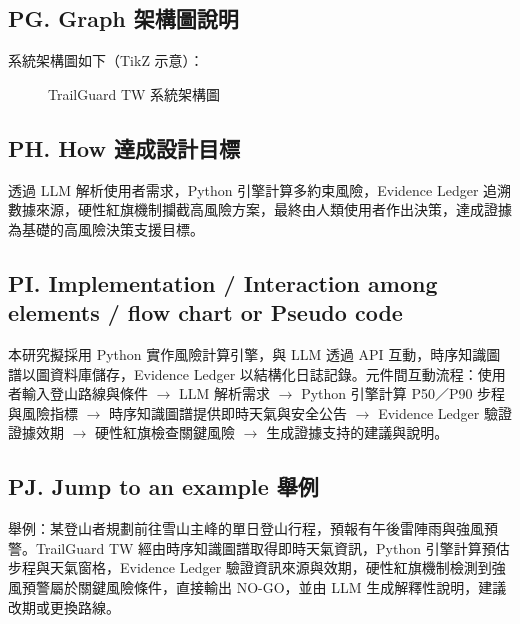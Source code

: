 \documentclass[12pt,a4paper]{article}
\begin{document}
\subsection*{PG. Graph 架構圖說明}
系統架構圖如下（TikZ 示意）：

\begin{figure}[htbp]
\centering
{}
\caption{TrailGuard TW 系統架構圖}
\label{fig:architecture}
\end{figure}

\subsection*{PH. How 達成設計目標}
透過 LLM 解析使用者需求，Python 引擎計算多約束風險，Evidence Ledger 追溯數據來源，硬性紅旗機制攔截高風險方案，最終由人類使用者作出決策，達成證據為基礎的高風險決策支援目標。

\subsection*{PI. Implementation / Interaction among elements / flow chart or Pseudo code}
本研究擬採用 Python 實作風險計算引擎，與 LLM 透過 API 互動，時序知識圖譜以圖資料庫儲存，Evidence Ledger 以結構化日誌記錄。元件間互動流程：使用者輸入登山路線與條件 $\rightarrow$ LLM 解析需求 $\rightarrow$ Python 引擎計算 P50／P90 步程與風險指標 $\rightarrow$ 時序知識圖譜提供即時天氣與安全公告 $\rightarrow$ Evidence Ledger 驗證證據效期 $\rightarrow$ 硬性紅旗檢查關鍵風險 $\rightarrow$ 生成證據支持的建議與說明。

\subsection*{PJ. Jump to an example 舉例}
舉例：某登山者規劃前往雪山主峰的單日登山行程，預報有午後雷陣雨與強風預警。TrailGuard TW 經由時序知識圖譜取得即時天氣資訊，Python 引擎計算預估步程與天氣窗格，Evidence Ledger 驗證資訊來源與效期，硬性紅旗機制檢測到強風預警屬於關鍵風險條件，直接輸出 NO-GO，並由 LLM 生成解釋性說明，建議改期或更換路線。
\end{document}
